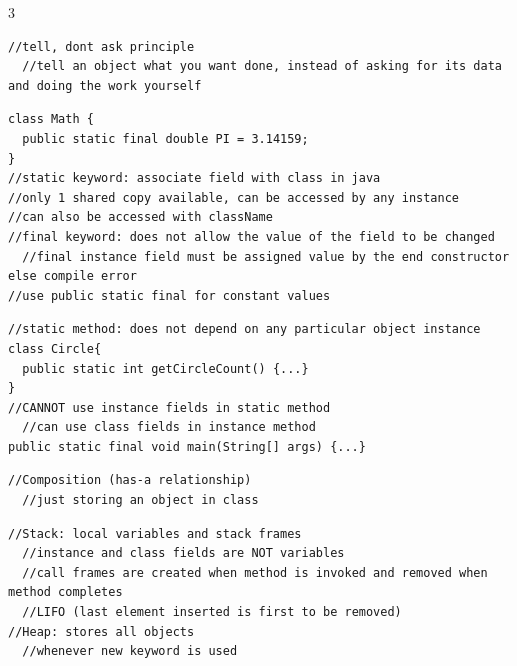 \documentclass[10pt,a4paper]{article}
\begin{document}
\begin{multicols*}{3}
\begin{verbatim}
//tell, dont ask principle
  //tell an object what you want done, instead of asking for its data and doing the work yourself
\end{verbatim}
\begin{verbatim}
class Math {
  public static final double PI = 3.14159;
}
//static keyword: associate field with class in java
//only 1 shared copy available, can be accessed by any instance
//can also be accessed with className
//final keyword: does not allow the value of the field to be changed
  //final instance field must be assigned value by the end constructor else compile error
//use public static final for constant values
\end{verbatim}
\begin{verbatim}
//static method: does not depend on any particular object instance
class Circle{
  public static int getCircleCount() {...}
}
//CANNOT use instance fields in static method
  //can use class fields in instance method
public static final void main(String[] args) {...}
\end{verbatim}
\begin{verbatim}
//Composition (has-a relationship)
  //just storing an object in class
\end{verbatim}
\begin{verbatim}
//Stack: local variables and stack frames
  //instance and class fields are NOT variables
  //call frames are created when method is invoked and removed when method completes
  //LIFO (last element inserted is first to be removed)
//Heap: stores all objects
  //whenever new keyword is used




\end{verbatim}
\end{multicols*}
\end{document}
